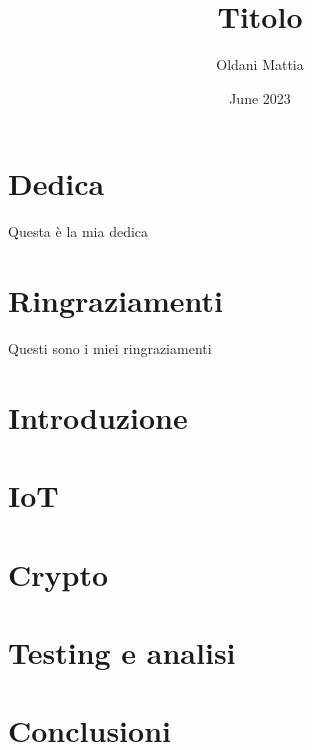 \documentclass{report}
\title{Titolo}
\author{Oldani Mattia}
\date{June 2023}
\begin{document}
\maketitle

\chapter{Dedica}
Questa è la mia dedica

\newpage

\chapter{Ringraziamenti}
Questi sono i miei ringraziamenti

\tableofcontents
\newpage

\chapter{Introduzione}
\newpage

\chapter{IoT}
\newpage

\chapter{Crypto}
\newpage

\chapter{Testing e analisi}
\newpage

\chapter{Conclusioni}
\newpage
\end{document}
